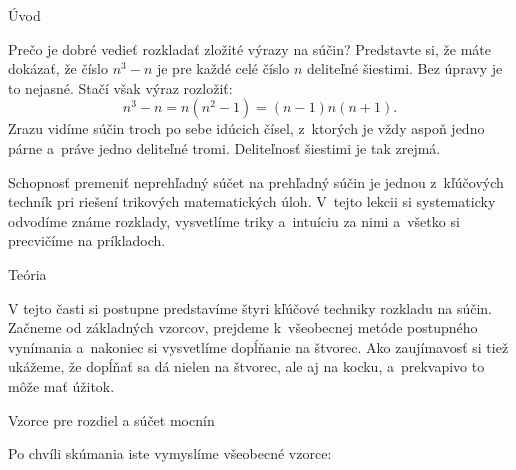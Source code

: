 




\sec Úvod

Prečo je dobré vedieť rozkladať zložité výrazy na súčin? Predstavte si, že máte dokázať, že číslo $n^3-n$ je pre každé celé číslo $n$ deliteľné šiestimi. Bez úpravy je to nejasné. Stačí však výraz rozložiť:
$$
n^3-n = n(n^2-1) = (n-1)n(n+1).
$$
Zrazu vidíme súčin troch po sebe idúcich čísel, z~ktorých je vždy aspoň jedno párne a~práve jedno deliteľné tromi. Deliteľnosť šiestimi je tak zrejmá.

Schopnosť premeniť neprehľadný súčet na prehľadný súčin je jednou z~kľúčových techník pri riešení trikových matematických úloh. V~tejto lekcii si systematicky odvodíme známe rozklady, vysvetlíme triky a~intuíciu za nimi a~všetko si precvičíme na príkladoch.

\sec Teória 

V tejto časti si postupne predstavíme štyri kľúčové techniky rozkladu na súčin. Začneme od základných vzorcov, prejdeme k~všeobecnej metóde postupného vynímania a~nakoniec si vysvetlíme dopĺňanie na štvorec. Ako zaujímavosť si tiež ukážeme, že dopĺňať sa dá nielen na štvorec, ale aj na kocku, a~prekvapivo to môže mať úžitok.

\secc Vzorce pre rozdiel a súčet mocnín



Po chvíli skúmania iste vymyslíme všeobecné vzorce:


